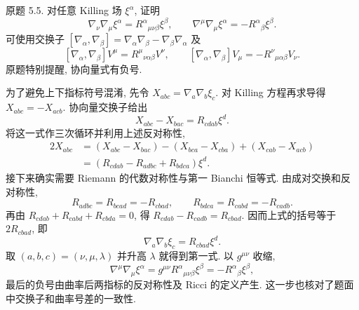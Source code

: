 \begin{exercise}
原题 5.5. 对任意 Killing 场 $\xi^\alpha$, 证明
\[
\nabla_\nu\nabla_\mu\xi^\alpha=R^\alpha{}_{\mu\nu\beta}\xi^\beta,
\qquad
\nabla^\mu\nabla_\mu\xi^\alpha=-R^\alpha{}_\beta\xi^\beta.
\]
可使用交换子 $[\nabla_\alpha,\nabla_\beta]=\nabla_\alpha\nabla_\beta-\nabla_\beta\nabla_\alpha$ 及
\[
[\nabla_\alpha,\nabla_\beta]V^\mu=R^\mu{}_{\nu\alpha\beta}V^\nu,
\qquad
[\nabla_\alpha,\nabla_\beta]V_\mu=-R^\nu{}_{\mu\alpha\beta}V_\nu.
\]
原题特别提醒, 协向量式有负号.
\end{exercise}
\begin{solution}
为了避免上下指标符号混淆, 先令 $X_{abc}=\nabla_a\nabla_b\xi_c$. 对 Killing 方程再求导得 $X_{abc}=-X_{acb}$. 协向量交换子给出
\[
X_{abc}-X_{bac}=R_{cdab}\xi^d.
\]
将这一式作三次循环并利用上述反对称性,
\begin{align*}
2X_{abc}
&=(X_{abc}-X_{bac})-(X_{bca}-X_{cba})
+(X_{cab}-X_{acb})\\
&=(R_{cdab}-R_{adbc}+R_{bdca})\xi^d.
\end{align*}
接下来确实需要 Riemann 的代数对称性与第一 Bianchi 恒等式. 由成对交换和反对称性,
\[
R_{adbc}=R_{bcad}=-R_{cbad},\qquad
R_{bdca}=R_{cabd}=-R_{cadb}.
\]
再由 $R_{cdab}+R_{cabd}+R_{cbda}=0$, 得 $R_{cdab}-R_{cadb}=R_{cbad}$. 因而上式的括号等于 $2R_{cbad}$, 即
\[
\nabla_a\nabla_b\xi_c=R_{cbad}\xi^d.
\]
取 $(a,b,c)=(\nu,\mu,\lambda)$ 并升高 $\lambda$ 就得到第一式. 以 $g^{\mu\nu}$ 收缩,
\[
\nabla^\mu\nabla_\mu\xi^\alpha
=g^{\mu\nu}R^\alpha{}_{\mu\nu\beta}\xi^\beta
=-R^\alpha{}_\beta\xi^\beta,
\]
最后的负号由曲率后两指标的反对称性及 Ricci 的定义产生. 这一步也核对了题面中交换子和曲率号差的一致性.
\end{solution}

